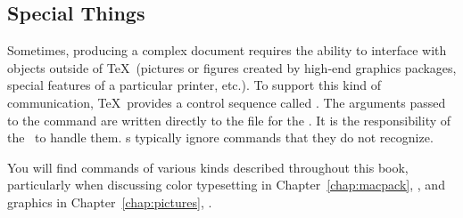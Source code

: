 \subsection{Special Things}

Sometimes, producing a complex document requires the ability to interface
with objects outside of \TeX\ (pictures or figures created by high-end
graphics packages, special features of a particular printer, etc.).  To
support this kind of communication, \TeX\ provides a control sequence
called .  The arguments passed to the 
command are written directly to the  file for the \dvidriver.
It is the responsibility of the \dvidriver\ to handle them.  \dvidriver{}s
typically ignore  commands that they do not recognize.

You will find  commands of various kinds described throughout
this book, particularly when discussing color typesetting in 
Chapter~\ref{chap:macpack}, \textit{}, and graphics
in Chapter~\ref{chap:pictures}, \textit{}.
